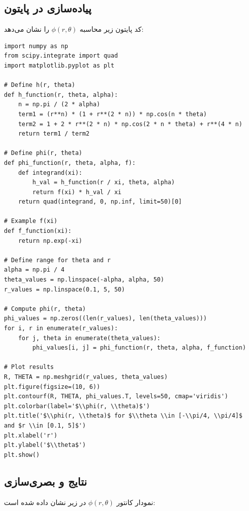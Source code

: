 \documentclass[12pt,a4paper]{article}
\begin{document}
\subsection{پیاده‌سازی در پایتون}
کد پایتون زیر محاسبه $\phi(r, \theta)$ را نشان می‌دهد:
\begin{verbatim}
import numpy as np
from scipy.integrate import quad
import matplotlib.pyplot as plt

# Define h(r, theta)
def h_function(r, theta, alpha):
    n = np.pi / (2 * alpha)
    term1 = (r**n) * (1 + r**(2 * n)) * np.cos(n * theta)
    term2 = 1 + 2 * r**(2 * n) * np.cos(2 * n * theta) + r**(4 * n)
    return term1 / term2

# Define phi(r, theta)
def phi_function(r, theta, alpha, f):
    def integrand(xi):
        h_val = h_function(r / xi, theta, alpha)
        return f(xi) * h_val / xi
    return quad(integrand, 0, np.inf, limit=50)[0]

# Example f(xi)
def f_function(xi):
    return np.exp(-xi)

# Define range for theta and r
alpha = np.pi / 4
theta_values = np.linspace(-alpha, alpha, 50)
r_values = np.linspace(0.1, 5, 50)

# Compute phi(r, theta)
phi_values = np.zeros((len(r_values), len(theta_values)))
for i, r in enumerate(r_values):
    for j, theta in enumerate(theta_values):
        phi_values[i, j] = phi_function(r, theta, alpha, f_function)

# Plot results
R, THETA = np.meshgrid(r_values, theta_values)
plt.figure(figsize=(10, 6))
plt.contourf(R, THETA, phi_values.T, levels=50, cmap='viridis')
plt.colorbar(label='$\\phi(r, \\theta)$')
plt.title('$\\phi(r, \\theta)$ for $\\theta \\in [-\\pi/4, \\pi/4]$ and $r \\in [0.1, 5]$')
plt.xlabel('r')
plt.ylabel('$\\theta$')
plt.show()
\end{verbatim}

\subsection{نتایج و بصری‌سازی}
نمودار کانتور $\phi(r, \theta)$ در زیر نشان داده شده است:
\end{document}
